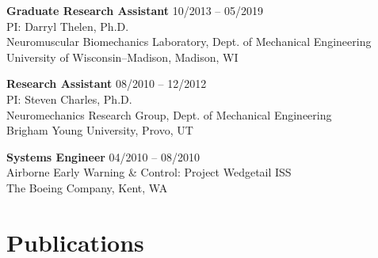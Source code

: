 \documentclass[letterpaper, 10pt]{article}
\begin{document}
\medskip

\textbf{Graduate Research Assistant} \hfill 10/2013 -- 05/2019
\\PI: Darryl Thelen, Ph.D.
\\Neuromuscular Biomechanics Laboratory, Dept. of Mechanical Engineering 
\\University of Wisconsin–Madison, Madison, WI

\medskip

\textbf{Research Assistant} \hfill 08/2010 -- 12/2012
\\PI: Steven Charles, Ph.D.
\\Neuromechanics Research Group, Dept. of Mechanical Engineering
\\Brigham Young University, Provo, UT

\medskip

\textbf{Systems Engineer} \hfill 04/2010 -- 08/2010
\\Airborne Early Warning \& Control: Project Wedgetail ISS 
\\The Boeing Company, Kent, WA

\section{Publications}

\end{document}

